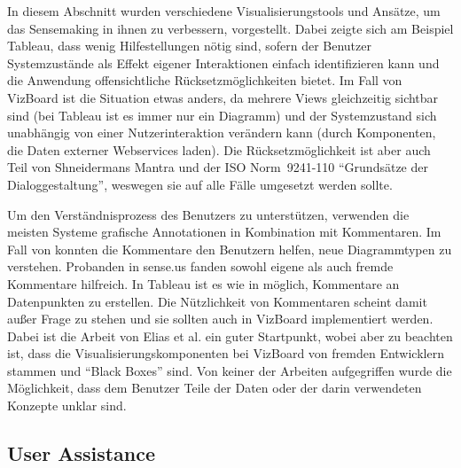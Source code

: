 \documentclass[
	headsepline,
	footsepline,
	fontsize=12pt,
	bibliography=totoc
]{scrbook}
\begin{document}


In diesem Abschnitt wurden verschiedene Visualisierungstools und Ansätze, um das Sensemaking in ihnen zu verbessern, vorgestellt. Dabei zeigte sich am Beispiel Tableau, dass wenig Hilfestellungen nötig sind, sofern der Benutzer Systemzustände als Effekt eigener Interaktionen einfach identifizieren kann und die Anwendung offensichtliche Rücksetzmöglichkeiten bietet. Im Fall von VizBoard ist die Situation etwas anders, da mehrere Views gleichzeitig sichtbar sind (bei Tableau ist es immer nur ein Diagramm) und der Systemzustand sich unabhängig von einer Nutzerinteraktion verändern kann (durch Komponenten, die Daten externer Webservices laden). Die Rücksetzmöglichkeit ist aber auch Teil von Shneidermans Mantra \cite{Shneiderman1996} und der ISO Norm~9241-110 \enquote{Grundsätze der Dialoggestaltung}, weswegen sie auf alle Fälle umgesetzt werden sollte.

Um den Verständnisprozess des Benutzers zu unterstützen, verwenden die meisten Systeme grafische Annotationen in Kombination mit Kommentaren. Im Fall von \cite{Elias2012} konnten die Kommentare den Benutzern helfen, neue Diagrammtypen zu verstehen. Probanden in sense.us fanden sowohl eigene als auch fremde Kommentare hilfreich. In Tableau ist es wie in \cite{Elias2012} möglich, Kommentare an Datenpunkten zu erstellen. Die Nützlichkeit von Kommentaren scheint damit außer Frage zu stehen und sie sollten auch in VizBoard implementiert werden. Dabei ist die Arbeit von Elias et al. ein guter Startpunkt, wobei aber zu beachten ist, dass die Visualisierungskomponenten bei VizBoard von fremden Entwicklern stammen und \enquote{Black Boxes} sind. Von keiner der Arbeiten aufgegriffen wurde die Möglichkeit, dass dem Benutzer Teile der Daten oder der darin verwendeten Konzepte unklar sind.

\subsection{User Assistance}
\end{document}
